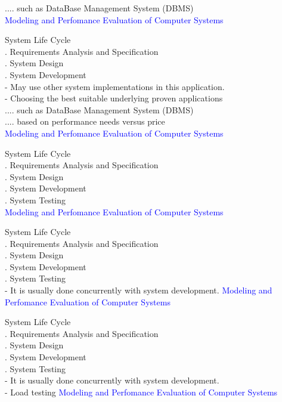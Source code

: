 \documentclass[svgnames]{beamer}
\begin{document}
 .... such as DataBase Management System (DBMS)\\
\newpage
\textcolor{blue}{Modeling and Perfomance Evaluation of Computer Systems} \\[38pt]
\raggedright
\! System Life Cycle\\
. Requirements Analysis and Specification\\
. System Design\\
. System Development\\[18pt]
- May use other system implementations in this application.\\
- Choosing the best suitable underlying proven applications\\
 .... such as DataBase Management System (DBMS)\\
 .... based on performance needs versus price\\
\newpage
\textcolor{blue}{Modeling and Perfomance Evaluation of Computer Systems} \\[38pt]
\raggedright
\! System Life Cycle\\
. Requirements Analysis and Specification\\
. System Design\\
. System Development\\
. System Testing\\
\newpage
\textcolor{blue}{Modeling and Perfomance Evaluation of Computer Systems} \\[38pt]
\raggedright
\! System Life Cycle\\
. Requirements Analysis and Specification\\
. System Design\\
. System Development\\
. System Testing\\[16pt]
 - It is usually done concurrently with system development.
\newpage
\textcolor{blue}{Modeling and Perfomance Evaluation of Computer Systems} \\[38pt]
\raggedright
\! System Life Cycle\\
. Requirements Analysis and Specification\\
. System Design\\
. System Development\\
. System Testing\\[16pt]
 - It is usually done concurrently with system development.\\
 - Load testing 
\newpage
\textcolor{blue}{Modeling and Perfomance Evaluation of Computer Systems} \\[38pt]
\end{document}
